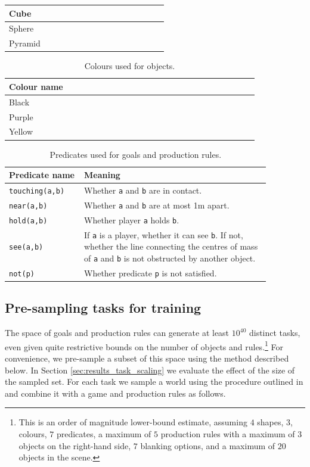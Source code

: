 \documentclass[11pt, a4paper, logo, copyright]{deepmind}
\begin{document}
\begin{appendix}
\begin{longtable}{|p{0.25\linewidth}|p{0.1\linewidth}p{0.52\linewidth}}
      Cube \\
      \hline
      Sphere \\
      \hline
      Pyramid \\
      \hline
\end{longtable}
\begin{longtable}{|p{0.25\linewidth}|p{0.1\linewidth}|p{0.52\linewidth}}
    \caption{Colours used for objects.}
    \label{tab:colors}
    \\ \hline
      \textbf{Colour name} \\
      \hline
      Black \\
      \hline
      Purple \\
      \hline
      Yellow \\
      \hline
\end{longtable}
\begin{longtable}{>{\raggedright}p{0.25\linewidth}|p{0.62\linewidth}}
    \caption{Predicates used for goals and production rules.}
    \label{tab:predicates}
    \\ \hline
      \textbf{Predicate name} & \textbf{Meaning} \\
      \hline
      \texttt{touching(a,b)} & Whether \texttt{a} and \texttt{b} are in contact. \\
      \hline
      \texttt{near(a,b)} & Whether \texttt{a} and \texttt{b} are at most 1m apart.\\
      \hline
      \texttt{hold(a,b)} & Whether player \texttt{a} holds \texttt{b}.\\
      \hline
      \texttt{see(a,b)} & If \texttt{a} is a player, whether it can see \texttt{b}. If not, whether the line connecting the centres of mass of \texttt{a} and \texttt{b} is not obstructed by another object.\\
      \hline
      \texttt{not(p)} & Whether predicate \texttt{p} is not satisfied. \\
      \hline
\end{longtable}
\subsection{Pre-sampling tasks for training} \label{app:presample_tasks}
The space of goals and production rules can generate at least $10^{40}$ distinct tasks, even given quite restrictive bounds on the number of objects and rules.\footnote{This is an order of magnitude lower-bound estimate, assuming $4$ shapes, $3$, colours, $7$ predicates, a maximum of $5$ production rules with a maximum of $3$ objects on the right-hand side, $7$ blanking options, and a maximum of $20$ objects in the scene.} For convenience, we pre-sample a subset of this space using the method described below. In Section \ref{sec:results_task_scaling} we evaluate the effect of the size of the sampled set. For each task we sample a world using the procedure outlined in \citet{xland} and combine it with a game and production rules as follows.

\end{appendix}
\end{document}
